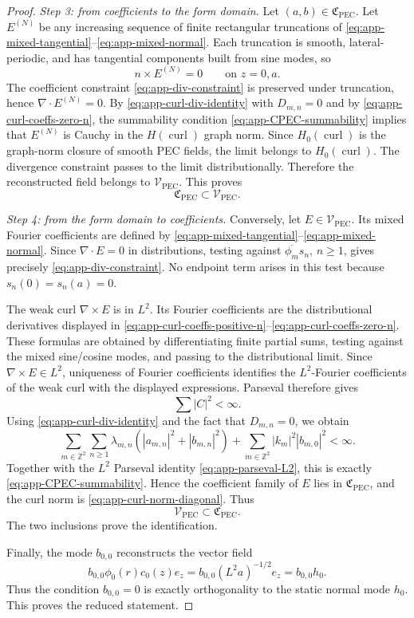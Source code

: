 \documentclass[10pt,a4paper]{amsart}
\providecommand{\Hzcurl}{H_0(\operatorname{curl})}
\providecommand{\VPEC}{\mathcal V_{\mathrm{PEC}}}
\providecommand{\Z}{\mathbb{Z}}
\providecommand{\abs}[1]{\left\lvert #1\right\rvert}
\providecommand{\hzero}{h_0}
\providecommand{\paren}[1]{\left(#1\right)}
\begin{document}
\begin{proof}
\emph{Step 3: from coefficients to the form domain.}
Let \((a,b)\in\mathfrak C_{\mathrm{PEC}}\).  Let \(E^{(N)}\) be any increasing
sequence of finite rectangular truncations of
\eqref{eq:app-mixed-tangential}--\eqref{eq:app-mixed-normal}.  Each truncation is
smooth, lateral-periodic, and has tangential components built from sine modes,
so
\[
    n\times E^{(N)}=0
    \qquad\text{on }z=0,a .
\]
The coefficient constraint \eqref{eq:app-div-constraint} is preserved under
truncation, hence \(\nabla\cdot E^{(N)}=0\).  By
\eqref{eq:app-curl-div-identity} with \(D_{m,n}=0\) and by
\eqref{eq:app-curl-coeffs-zero-n}, the summability condition
\eqref{eq:app-CPEC-summability} implies that \(E^{(N)}\) is Cauchy in the
\(H(\operatorname{curl})\) graph norm.  Since \(\Hzcurl\) is the graph-norm
closure of smooth PEC fields, the limit belongs to \(\Hzcurl\).  The divergence
constraint passes to the limit distributionally.  Therefore the reconstructed
field belongs to \(\VPEC\).  This proves
\[
    \mathfrak C_{\mathrm{PEC}}\subset\VPEC .
\]

\emph{Step 4: from the form domain to coefficients.}
Conversely, let \(E\in\VPEC\).  Its mixed Fourier coefficients are defined by
\eqref{eq:app-mixed-tangential}--\eqref{eq:app-mixed-normal}.  Since
\(\nabla\cdot E=0\) in distributions, testing against
\(\overline{\phi_m}s_n\), \(n\ge1\), gives precisely
\eqref{eq:app-div-constraint}.  No endpoint term arises in this test because
\(s_n(0)=s_n(a)=0\).

The weak curl \(\nabla\times E\) is in \(L^2\).  Its Fourier coefficients are the
distributional derivatives displayed in
\eqref{eq:app-curl-coeffs-positive-n}--\eqref{eq:app-curl-coeffs-zero-n}.  These
formulas are obtained by differentiating finite partial sums, testing against
the mixed sine/cosine modes, and passing to the distributional limit.  Since
\(\nabla\times E\in L^2\), uniqueness of Fourier coefficients identifies the
\(L^2\)-Fourier coefficients of the weak curl with the displayed expressions.
Parseval
therefore gives
\[
    \sum\abs{C}^2<\infty .
\]
Using \eqref{eq:app-curl-div-identity} and the fact that
\(D_{m,n}=0\), we obtain
\[
    \sum_{m\in\Z^2}\sum_{n\ge1}
    \lambda_{m,n}
    \paren{\abs{a_{m,n}}^2+\abs{b_{m,n}}^2}
    +
    \sum_{m\in\Z^2}\abs{k_m}^2\abs{b_{m,0}}^2
    <\infty .
\]
Together with the \(L^2\) Parseval identity \eqref{eq:app-parseval-L2}, this is
exactly \eqref{eq:app-CPEC-summability}.  Hence the coefficient family of
\(E\) lies in \(\mathfrak C_{\mathrm{PEC}}\), and the curl norm is
\eqref{eq:app-curl-norm-diagonal}.  Thus
\[
    \VPEC\subset\mathfrak C_{\mathrm{PEC}} .
\]
The two inclusions prove the identification.

Finally, the mode \(b_{0,0}\) reconstructs the vector field
\[
    b_{0,0}\phi_0(r)c_0(z)e_z
    =
    b_{0,0}(L^2a)^{-1/2}e_z
    =
    b_{0,0}\hzero .
\]
Thus the condition \(b_{0,0}=0\) is exactly orthogonality to the static normal
mode \(\hzero\).  This proves the reduced statement.
\end{proof}
\end{document}
